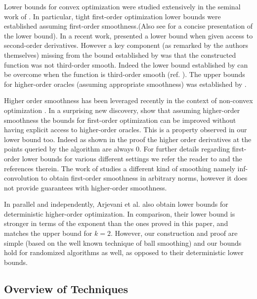 \documentclass[final,12pt]{colt2018} %
\begin{document}
Lower bounds for convex optimization were studied extensively in the seminal work of \cite{Nemirovsky1978}. In particular, tight first-order optimization lower bounds were established assuming first-order smoothness.(Also see \cite{NesterovBook} for a concise presentation of the lower bound). In a recent work, \cite{arjevanisecondorder} presented a lower bound when given access to second-order derivatives. However a key component (as remarked by the authors themselves) missing from the bound established by \cite{arjevanisecondorder} was that the constructed function was not third-order smooth. Indeed the lower bound established by \cite{arjevanisecondorder} can  be overcome when the function is third-order smooth (ref. \cite{nesterov2008cubic}). The upper bounds for higher-order oracles (assuming appropriate smoothness) was established by \cite{baeshigherorder}. 

Higher order smoothness has been leveraged recently in the context of non-convex optimization \citep{Agarwal:2017:FAL:3055399.3055464,CarmonAGD,allen2017natasha}. In a surprising new discovery, \cite{carmon2017convex} show that assuming higher-order smoothness the bounds for first-order optimization can be improved without having explicit access to higher-order oracles. This is a property observed in our lower bound too. Indeed as shown in the proof the higher order derivatives at the points queried by the algorithm are always 0. For further details regarding first-order lower bounds for various different settings we refer the reader to \cite{agarwal2009information,woodworth2016tight,arjevanisecondorder,arjevani2015lower} and the references therein. The work of \cite{guzman2015lower} studies a different kind of smoothing namely inf-convolution to obtain first-order smoothness in arbitrary norms, however it does not provide guarantees with higher-order smoothness.

In parallel and independently, Arjevani et al. \cite{shamir2017oracle} also obtain lower bounds for deterministic higher-order optimization.  In comparison, their lower bound is stronger in terms of the exponent than the ones proved in this paper, and matches the upper bound for $k=2$.  However, our construction and proof are simple (based on the well known technique of ball smoothing) and our bounds hold for randomized algorithms as well, as opposed to their deterministic lower bounds. 

\subsection{Overview of Techniques}
\end{document}
